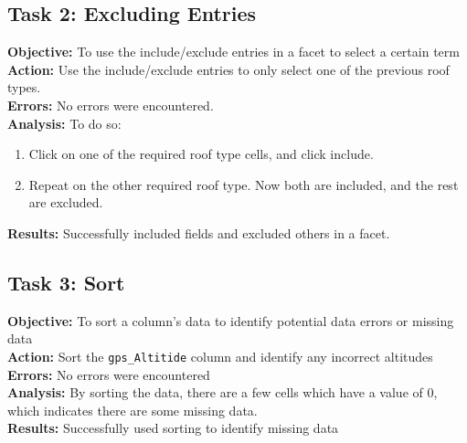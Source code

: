 \documentclass{article}
\begin{document}
\subsection{Task 2: Excluding Entries}
\textbf{Objective:} To use the include/exclude entries in a facet to select a certain term\\
\textbf{Action:} Use the include/exclude entries to only select one of the previous roof types.\\
\textbf{Errors:} No errors were encountered.\\
\textbf{Analysis:} To do so:
\begin{enumerate}
    \item Click on one of the required roof type cells, and click include.
    \item Repeat on the other required roof type. Now both are included, and the rest are excluded.
\end{enumerate}
\textbf{Results:} Successfully included fields and excluded others in a facet.
\subsection{Task 3: Sort}
\textbf{Objective:} To sort a column's data to identify potential data errors or missing data\\
\textbf{Action:} Sort the \texttt{gps\_Altitide} column and identify any incorrect altitudes\\
\textbf{Errors:} No errors were encountered\\
\textbf{Analysis:} By sorting the data, there are a few cells which have a value of 0, which indicates there are some missing data.\\
\textbf{Results:} Successfully used sorting to identify missing data
\end{document}
